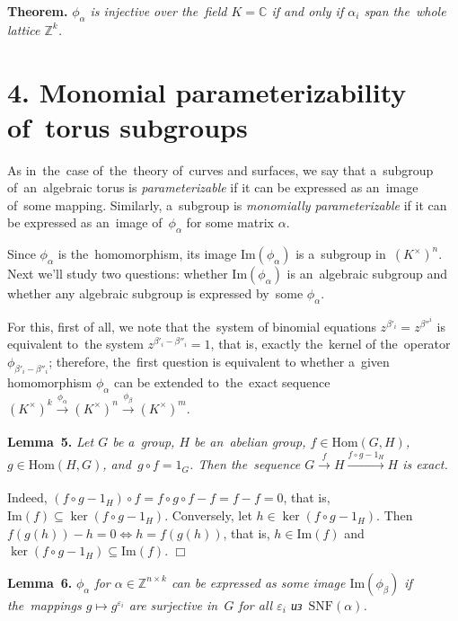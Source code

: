 \documentclass[twoside]{article}
\begin{document}
\medskip\noindent\textbf{Theorem.}\emph{
    $\phi_\alpha$ is injective over the~field $K = \mathbb{C}$ if and only if $\alpha_i$ span the~whole lattice $\mathbb{Z}^k$.
}

\section*{4. Monomial parameterizability of~torus subgroups}

As in~the~case of~the~theory of~curves and surfaces, we say that a~subgroup of~an~algebraic torus
is \textit{parameterizable} if it can be expressed as an~image of~some mapping. Similarly, a~subgroup
is \textit{monomially parameterizable} if it can be expressed as an~image of~$\phi_\alpha$ for some matrix $\alpha$.

Since $\phi_\alpha$ is the~homomorphism, its image $\mathrm{Im}(\phi_\alpha)$ is a~subgroup in~$(K^\times)^n$.
Next we'll study two questions: whether $\mathrm{Im}(\phi_\alpha)$ is an~algebraic subgroup and whether
any algebraic subgroup is expressed by~some $\phi_\alpha$.

For this, first of all, we note that the~system of binomial equations $z^{\beta'_i} = z^{\beta''^i}$ is equivalent
to~the system $z^{\beta'_i - \beta''_i} = 1$, that is, exactly the~kernel of the~operator $\phi_{\beta'_i - \beta''_i}$;
therefore, the~first question is equivalent to whether a~given homomorphism $\phi_\alpha$ can be extended
to~the~exact sequence $(K^\times)^k \xrightarrow[]{\phi_\alpha} (K^\times)^n \xrightarrow[]{\phi_\beta} (K^\times)^m$.

\medskip\noindent\textbf{Lemma~5.}\emph{
    Let $G$ be a~group, $H$ be an~abelian group, $f \in \mathrm{Hom}(G, H)$, $g \in \mathrm{Hom}(H, G)$, and~$g \circ f = 1_G$.
    Then the~sequence $G \xrightarrow[]{f} H \xrightarrow[]{f \circ g - 1_H} H$ is exact.
}\medskip

    Indeed, $(f \circ g - 1_H) \circ f = f \circ g \circ f - f = f - f = 0$, that is, $\mathrm{Im}(f) \subseteq \ker(f \circ g - 1_H)$.
    Conversely, let $h \in \ker(f \circ g - 1_H)$. Then $f(g(h)) - h = 0 \Leftrightarrow h = f(g(h))$, that is, $h \in \mathrm{Im}(f)$
    and $\ker(f \circ g - 1_H) \subseteq \mathrm{Im}(f)$.
\hfill$\Box$\medskip

\medskip\noindent\textbf{Lemma~6.}\emph{
    $\phi_\alpha$ for $\alpha \in \mathbb{Z}^{n \times k}$ can be expressed as some image $\mathrm{Im}(\phi_\beta)$
    if the~mappings $g \mapsto g^{\varepsilon_i}$ are surjective in~$G$ for all $\varepsilon_i$ из~$\mathrm{SNF}(\alpha)$.
}\medskip
\end{document}
